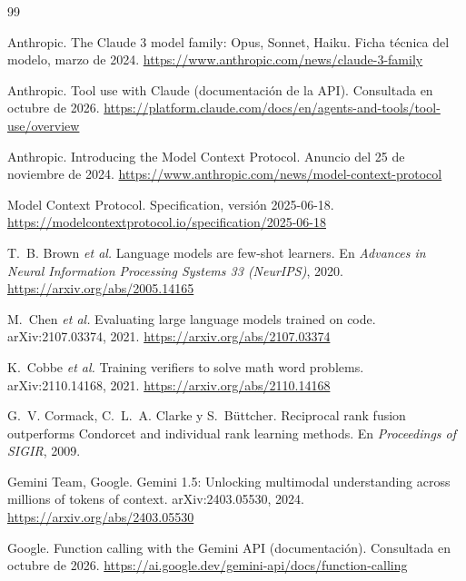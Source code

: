 \begin{thebibliography}{99}
\small

Anthropic.
\newblock The Claude 3 model family: Opus, Sonnet, Haiku.
\newblock Ficha técnica del modelo, marzo de 2024.
\newblock \url{https://www.anthropic.com/news/claude-3-family}

Anthropic.
\newblock Tool use with Claude (documentación de la API).
\newblock Consultada en octubre de 2026.
\newblock \url{https://platform.claude.com/docs/en/agents-and-tools/tool-use/overview}

Anthropic.
\newblock Introducing the Model Context Protocol.
\newblock Anuncio del 25 de noviembre de 2024.
\newblock \url{https://www.anthropic.com/news/model-context-protocol}

Model Context Protocol.
\newblock Specification, versión 2025-06-18.
\newblock \url{https://modelcontextprotocol.io/specification/2025-06-18}

T.~B. Brown \emph{et al.}
\newblock Language models are few-shot learners.
\newblock En \emph{Advances in Neural Information Processing Systems 33 (NeurIPS)}, 2020.
\newblock \url{https://arxiv.org/abs/2005.14165}

M.~Chen \emph{et al.}
\newblock Evaluating large language models trained on code.
\newblock arXiv:2107.03374, 2021.
\newblock \url{https://arxiv.org/abs/2107.03374}

K.~Cobbe \emph{et al.}
\newblock Training verifiers to solve math word problems.
\newblock arXiv:2110.14168, 2021.
\newblock \url{https://arxiv.org/abs/2110.14168}

G.~V. Cormack, C.~L.~A. Clarke y S.~Büttcher.
\newblock Reciprocal rank fusion outperforms Condorcet and individual rank learning methods.
\newblock En \emph{Proceedings of SIGIR}, 2009.

Gemini Team, Google.
\newblock Gemini 1.5: Unlocking multimodal understanding across millions of tokens of context.
\newblock arXiv:2403.05530, 2024.
\newblock \url{https://arxiv.org/abs/2403.05530}

Google.
\newblock Function calling with the Gemini API (documentación).
\newblock Consultada en octubre de 2026.
\newblock \url{https://ai.google.dev/gemini-api/docs/function-calling}


\end{thebibliography}
